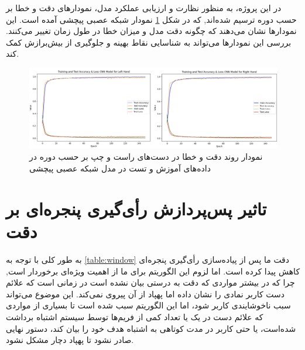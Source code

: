 در این پروژه، به منظور نظارت و ارزیابی عملکرد مدل، نمودارهای دقت و خطا بر حسب دوره ترسیم شده‌اند, که در شکل \ref{acc} نمودار شبکه عصبی پیچشی آمده‌ است. این نمودارها نشان می‌دهند که چگونه دقت مدل و میزان خطا در طول زمان تغییر می‌کنند. بررسی این نمودارها می‌تواند به شناسایی نقاط بهینه و جلوگیری از بیش‌برازش کمک کند.





\begin{figure}[h]
    \centering
    \includegraphics[width=1\textwidth]{Chart_CNN.png}
    \caption{نمودار روند دقت و خطا در دست‌های راست و چپ بر حسب دوره در داده‌های آموزش و تست در مدل شبکه عصبی پیچشی}
    \label{acc}
\end{figure}




\section{تاثیر پس‌پردازش رأی‌گیری پنجره‌ای بر دقت}
به طور کلی با توجه به 
\cref{table:window}
 دقت ما پس از پیاده‌سازی رأی‌گیری پنجره‌ای کاهش پیدا کرده است. اما لزوم این الگوریتم برای ما از اهمیت ویژه‌ای برخوردار است, چرا که در بیشتر مواردی که دقت به درستی بیان نشده است در زمانی است که علائم دست کاربر نمادی را نشان داده اما پهپاد از آن پیروی نمی‌کند. این موضوع می‌تواند سبب ناخوشایندی کاربر شود، اما این الگوریتم سبب شده است تا بسیاری از
 مواردی که علائم دست در یک یا تعداد کمی از فریم‌ها توسط سیستم اشتباه برداشت شده‌است، یا حتی کاربر در مدت کوتاهی به اشتباه هدف خود را بیان کند، دستور نهایی صادر نشود تا پهپاد دچار مشکل نشود.

